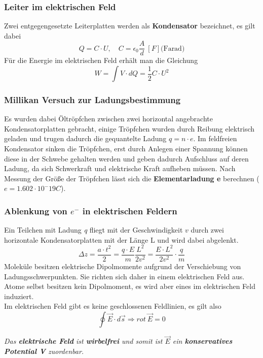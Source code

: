 \documentclass[12pt,a4paper,ngerman]{article}
\begin{document}
\subsubsection*{Leiter im elektrischen Feld}
Zwei entgegengesetzte Leiterplatten werden als \textbf{Kondensator} bezeichnet, es gilt dabei 
\begin{equation}
Q = C \cdot U, \quad C = \epsilon_0\frac{A}{d} \ [F]\text{(Farad)}
\end{equation}
Für die Energie im elektrischen Feld erhält man die Gleichung
\begin{equation}
W = \int{V \cdot dQ} = \frac{1}{2}C \cdot U^2
\end{equation}

\pagebreak

\subsubsection*{Millikan Versuch zur Ladungsbestimmung}
Es wurden dabei Öltröpfchen zwischen zwei horizontal angebrachte Kondensatorplatten gebracht, einige Tröpfchen wurden durch Reibung elektrisch geladen und trugen dadurch die gequantelte Ladung $q = n \cdot e$. Im feldfreien Kondensator sinken die Tröpfchen, erst durch Anlegen einer Spannung können diese in der Schwebe gehalten werden und geben dadurch Aufschluss auf deren Ladung, da sich Schwerkraft und elektrische Kraft aufheben müssen. 
Nach Messung der Größe der Tröpfchen lässt sich die \textbf{Elementarladung e} berechnen ($e = 1.602\cdot 10^-19 C$).

\subsubsection*{Ablenkung von $e^-$ in elektrischen Feldern}
Ein Teilchen mit Ladung \textit{q} fliegt mit der Geschwindigkeit $v$ durch zwei horizontale Kondensatorplatten mit der Länge L und wird dabei abgelenkt. 
\begin{equation}
\Delta z = \frac{a \cdot t^2}{2} = \frac{q \cdot E}{m}\frac{L^2}{2v^2} = \frac{E\cdot L^2}{2v^2} \cdot \frac{q}{m}
\end{equation}
Moleküle besitzen elektrische Dipolmomente aufgrund der Verschiebung von Ladungsschwerpunkten. Sie richten sich daher in einem elektrischen Feld aus. Atome selbst besitzen kein Dipolmoment, es wird aber eines im elektrischen Feld induziert. \\
Im elektrischen Feld gibt es keine geschlossenen Feldlinien, es gilt also
\begin{equation}
\oint{\vec{E}\cdot d\vec{s}} \Rightarrow rot \ \vec{E} = 0
\end{equation}
\begin{center}
\textit{Das \textbf{elektrische Feld} ist \textbf{wirbelfrei} und somit ist $\vec{E}$ ein \textbf{konservatives Potential V} zuordenbar.}
\end{center}
\end{document}
